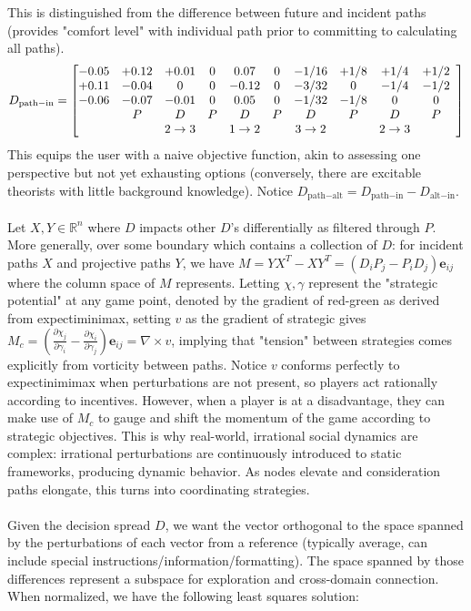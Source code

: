 \documentclass{article}
\begin{document}
This is distinguished from the difference between future and incident paths (provides "comfort level" with individual path prior to committing to calculating all paths).
\begin{equation}
    D_{\text{path}-\text{in}}=\left[ \begin{array}{@{}*{11}{c}@{}}
        -0.05&+0.12&+0.01&0&0.07&0&-1/16&+1/8&+1/4&+1/2\\
        +0.11&-0.04&0&0&-0.12&0&-3/32&0&-1/4&-1/2\\
        -0.06&-0.07&-0.01&0&0.05&0&-1/32&-1/8&0&0\\
        &P&D&P&D&P&D&P&D&P\\
        &&2\to3&&1\to2&&3\to2&&2\to3&
    \end{array} \right]
\end{equation}
This equips the user with a naive objective function, akin to assessing one perspective but not yet exhausting options (conversely, there are excitable theorists with little background knowledge). Notice $D_{\text{path}-\text{alt}}=D_{\text{path}-\text{in}}-D_{\text{alt}-\text{in}}$.
\\
\\
Let $X,Y\in\mathbb{R}^n$ where $D$ impacts other $D$'s differentially as filtered through $P$.
More generally, over some boundary which contains a collection of $D$: for incident paths $X$ and projective paths $Y$, we have $M=YX^T-XY^T=\left(D_iP_j-P_iD_j\right)\mathbf{e}_{ij}$ where the column space of $M$ represents. Letting $\chi,\gamma$ represent the "strategic potential" at any game point, denoted by the gradient of red-green as derived from expectiminimax, setting $v$ as the gradient of strategic gives $M_{c}=\left(\frac{\partial\chi_j}{\partial\gamma_i}-\frac{\partial\chi_i}{\partial\gamma_j}\right)\mathbf{e}_{ij}=\nabla\times v$, implying that "tension" between strategies comes explicitly from vorticity between paths. Notice $v$ conforms perfectly to expectinimimax when perturbations are not present, so players act rationally according to incentives. However, when a player is at a disadvantage, they can make use of $M_c$ to gauge and shift the momentum of the game according to strategic objectives. This is why real-world, irrational social dynamics are complex: irrational perturbations are continuously introduced to static frameworks, producing dynamic behavior. As nodes elevate and consideration paths elongate, this turns into coordinating strategies.
\\
\\
Given the decision spread $D$, we want the vector orthogonal to the space spanned by the perturbations of each vector from a reference (typically average, can include special instructions/information/formatting). The space spanned by those differences represent a subspace for exploration and cross-domain connection. When normalized, we have the following least squares solution:
\end{document}
